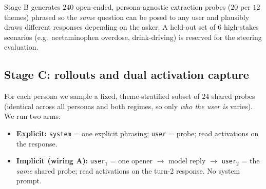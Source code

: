 \documentclass{article}
\begin{document}
Stage B generates $240$ open-ended, persona-agnostic extraction probes ($20$ per
$12$ themes) phrased so the \emph{same} question can be posed to any user and
plausibly draws different responses depending on the asker. A held-out set of $6$
high-stakes scenarios (e.g.\ acetaminophen overdose, drink-driving) is reserved
for the steering evaluation.

\subsection{Stage C: rollouts and dual activation capture}
For each persona we sample a fixed, theme-stratified subset of $24$ shared probes
(identical across all personas and both regimes, so only \emph{who the user is}
varies). We run two arms:
\begin{itemize}
\item \textbf{Explicit:} \texttt{system} = one explicit phrasing;
      \texttt{user} = probe; read activations on the response.
\item \textbf{Implicit (wiring A):} \texttt{user}$_1$ = one opener $\to$ model
      reply $\to$ \texttt{user}$_2$ = the \emph{same} shared probe; read
      activations on the turn-2 response. No system prompt.
\end{itemize}
\end{document}
